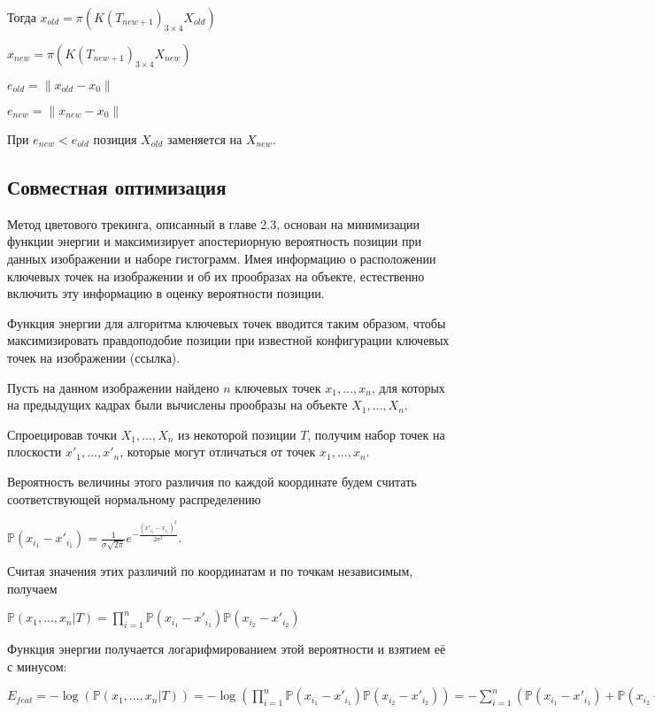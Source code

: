 Тогда $x_{old} = \pi (K (T_{new + 1})_{3 \times 4} X_{old})$

$x_{new} = \pi (K (T_{new + 1})_{3 \times 4} X_{new})$

$e_{old} = \| x_{old} - x_0 \|$

$e_{new} = \| x_{new} - x_0 \|$

При $e_{new} < e_{old}$ позиция $X_{old}$ заменяется на $X_{new}$.

\subsection{Совместная оптимизация}
Метод цветового трекинга, описанный в главе 2.3, основан на минимизации функции энергии и максимизирует апостериорную вероятность позиции при данных изображении и наборе гистограмм. Имея информацию о расположении ключевых точек на изображении и об их прообразах на объекте, естественно включить эту информацию в оценку вероятности позиции.

Функция энергии для алгоритма ключевых точек вводится таким образом, чтобы максимизировать правдоподобие позиции при известной конфигурации ключевых точек на изображении (ссылка).

Пусть на данном изображении найдено $n$ ключевых точек $x_1, ..., x_n$, для которых на предыдущих кадрах были вычислены прообразы на объекте $X_1, ..., X_n$. 

Спроецировав точки $X_1, ..., X_n$ из некоторой позиции $T$, получим набор точек на плоскости $x'_1, ..., x'_n$, которые могут отличаться от точек $x_1, ..., x_n$.

 Вероятность величины этого различия по каждой координате будем считать соответствующей нормальному распределению

$\mathbb{P}(x_{i_1} - x'_{i_1}) = \frac{1}{\sigma \sqrt{2 \pi}}e^{- \frac{(x'_{i_1} - x_{i_1})^2}{2 \sigma^2}}$.

Считая значения этих различий по координатам и по точкам независимым, получаем

$\mathbb{P}(x_1, ..., x_n | T) = \prod\limits_{i = 1}^n \mathbb{P}(x_{i_1} - x'_{i_1})\mathbb{P}(x_{i_2} - x'_{i_2})$

Функция энергии получается логарифмированием этой вероятности и взятием её с минусом:

$E_{feat} = - \log(\mathbb{P}(x_1, ..., x_n | T)) = 
- \log(\prod\limits_{i = 1}^n \mathbb{P}(x_{i_1} - x'_{i_1}) \mathbb{P}(x_{i_2} - x'_{i_2})) =  - \sum\limits_{i = 1}^{n}( \mathbb{P}(x_{i_1} - x'_{i_1}) + \mathbb{P}(x_{i_2} - x'_{i_2}))$

